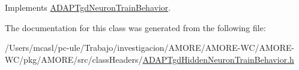 Implements \hyperlink{class_a_d_a_p_tgd_neuron_train_behavior_a517162e38c48a87bf26aa01bfcecffa3}{ADAPTgdNeuronTrainBehavior}.



The documentation for this class was generated from the following file:\begin{DoxyCompactItemize}
\item 
/Users/mcasl/pc-\/ule/Trabajo/investigacion/AMORE/AMORE-\/WC/AMORE-\/WC/pkg/AMORE/src/classHeaders/\hyperlink{_a_d_a_p_tgd_hidden_neuron_train_behavior_8h}{ADAPTgdHiddenNeuronTrainBehavior.h}\end{DoxyCompactItemize}
